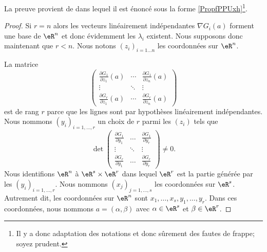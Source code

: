 La preuve provient de \cite{ytMOpe} dans lequel il est énoncé sous la forme \ref{PropfPPUxh}\footnote{Il y a donc adaptation des notations et donc sûrement des fautes de frappe; soyez prudent.}.
\begin{proof}
    Si \( r=n\) alors les vecteurs linéairement indépendantes \( \nabla G_i(a) \) forment une base de \( \eR^n\) et donc évidemment les \( \lambda_i\) existent. Nous supposons donc maintenant que \( r<n\). Nous notons \( (z_i)_{i=1\ldots n}\) les coordonnées sur \( \eR^n\).
    
    La matrice
    \begin{equation}
        \begin{pmatrix}
            \frac{ \partial G_1 }{ \partial z_1 }(a)    &   \cdots    &   \frac{ \partial G_1 }{ \partial z_n }(a)    \\
            \vdots    &   \ddots    &   \vdots    \\
            \frac{ \partial G_r }{ \partial z_1 }(a)    &   \cdots    &   \frac{ \partial G_r }{ \partial z_n }(a)
        \end{pmatrix}
    \end{equation}
    est de rang \( r\) parce que les lignes sont par hypothèses linéairement indépendantes. Nous nommons \( (y_i)_{i=1,\ldots, r}\) un choix de \( r\) parmi les \( (z_i)\) tels que
    \begin{equation}
        \det\begin{pmatrix}
            \frac{ \partial G_1 }{ \partial y_1 }    &   \ldots    &   \frac{ \partial G_1 }{ \partial y_r }    \\
            \vdots    &   \ddots    &   \vdots    \\
            \frac{ \partial G_r }{ \partial y_1 }    &   \ldots    &   \frac{ \partial G_r }{ \partial y_r }
        \end{pmatrix}\neq 0.
    \end{equation}
    Nous identifions \( \eR^n\) à \( \eR^s\times \eR^r\) dans lequel \( \eR^r\) est la partie générée par les \( (y_i)_{i=1,\ldots, r}\). Nous nommons \( (x_j)_{j=1,\ldots, s}\) les coordonnées sur \( \eR^s\). Autrement dit, les coordonnées sur \( \eR^n\) sont \( x_1,\ldots, x_s,y_1,\ldots, y_r\). Dans ces coordonnées, nous nommons \( a=(\alpha,\beta)\) avec \( \alpha\in \eR^s\) et \( \beta\in \eR^r\).


\end{proof}
